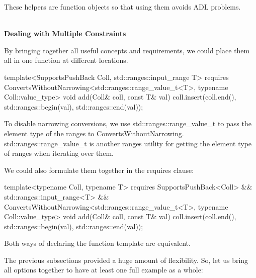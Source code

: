 These helpers are function objects so that using them avoids ADL problems.

\noindent
\hspace*{\fill} \\ %
\textbf{Dealing with Multiple Constraints}

By bringing together all useful concepts and requirements, we could place them all in one function at different locations.

\begin{cpp}
template<SupportsPushBack Coll, std::ranges::input_range T>
requires ConvertsWithoutNarrowing<std::ranges::range_value_t<T>,
typename Coll::value_type>
void add(Coll& coll, const T& val)
{
	coll.insert(coll.end(),
				std::ranges::begin(val), std::ranges::end(val));
}
\end{cpp}

To disable narrowing conversions, we use std::ranges::range\_value\_t to pass the element type of the ranges to ConvertsWithoutNarrowing. std::ranges::range\_value\_t is another ranges utility for getting the element type of ranges when iterating over them.

We could also formulate them together in the requires clause:

\begin{cpp}
template<typename Coll, typename T>
requires SupportsPushBack<Coll> &&
			std::ranges::input_range<T> &&
			ConvertsWithoutNarrowing<std::ranges::range_value_t<T>,
							typename Coll::value_type>
void add(Coll& coll, const T& val)
{
	coll.insert(coll.end(),
				std::ranges::begin(val), std::ranges::end(val));
}
\end{cpp}

Both ways of declaring the function template are equivalent.


The previous subsections provided a huge amount of flexibility. So, let us bring all options together to have at least one full example as a whole:



